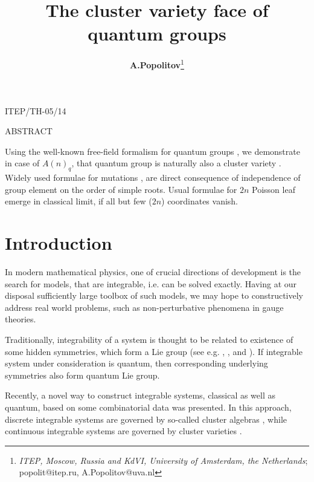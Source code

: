 \documentclass{article}
\title{{\bf The cluster variety face of quantum groups} \vspace{.2cm}}
\author{{\bf A.Popolitov}\thanks{{\small
{\it ITEP, Moscow, Russia and KdVI, University of Amsterdam, the Netherlands}}; popolit@itep.ru, A.Popolitov@uva.nl}}
\newcommand {\?}{\textit{???}}
\begin{document}
 \maketitle

\vspace{-5.0cm}

\begin{center}
\hfill ITEP/TH-05/14\\
\end{center}

\vspace{3.5cm}

\centerline{ABSTRACT}

\bigskip

{\footnotesize
Using the well-known free-field formalism for quantum groups \cite{MV1}, we demonstrate
in case of $A(n)_q$, that quantum group is naturally also a cluster variety \cite{FG1}.
Widely used \cite{Hik1} formulae for mutations \cite{FG1},\cite{FG2} are
direct consequence of independence of group element on the order of simple roots.
Usual formulae \cite{Mars1} for $2 n$ Poisson leaf emerge in classical limit,
if all but few ($2n$) coordinates vanish.
}


\tableofcontents

\bigskip

\bigskip

\section{Introduction}

In modern mathematical physics, one of crucial directions of development is
the search for models, that are integrable, i.e. can be solved exactly.
Having at our disposal sufficiently large toolbox of such models, we
may hope to constructively address real world problems, such as
non-perturbative phenomena in gauge theories.

Traditionally, integrability of a system is
thought to be related to existence of some hidden symmetries, which form a Lie group
(see e.g. \cite{M1}, \cite{M2}, \cite{AASZ} and \cite{LOZ1}).
 If integrable system under consideration is quantum, then
corresponding underlying symmetries also form quantum Lie group.

Recently, a novel way to construct integrable systems, classical as well as quantum,
based on some combinatorial data was presented.
In this approach, discrete integrable systems are governed by so-called cluster algebras \cite{GShTV}, while
continuous integrable systems are governed by cluster varieties \cite{FM}.
\end{document}
